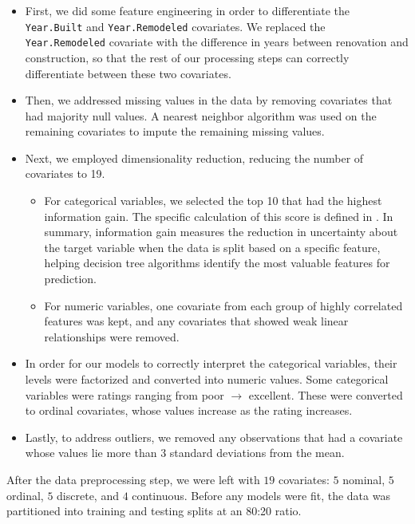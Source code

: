 \documentclass[aoas]{imsart}
\providecommand{\tightlist}{%
  \setlength{\itemsep}{0pt}\setlength{\parskip}{0pt}}
\numberwithin{equation}{section}
\theoremstyle{plain}
\theoremstyle{remark}
\begin{document}
\begin{itemize}
\item
  First, we did some feature engineering in order to differentiate the
  \texttt{Year.Built} and \texttt{Year.Remodeled} covariates. We
  replaced the \texttt{Year.Remodeled} covariate with the difference in
  years between renovation and construction, so that the rest of our
  processing steps can correctly differentiate between these two
  covariates.
\item
  Then, we addressed missing values in the data by removing covariates
  that had majority null values. A nearest neighbor algorithm was used
  on the remaining covariates to impute the remaining missing values.
\item
  Next, we employed dimensionality reduction, reducing the number of
  covariates to 19.

  \begin{itemize}
  \tightlist
  \item
    For categorical variables, we selected the top 10 that had the
    highest information gain. The specific calculation of this score is
    defined in \citet{quinlaninduction}. In summary, information gain
    measures the reduction in uncertainty about the target variable when
    the data is split based on a specific feature, helping decision tree
    algorithms identify the most valuable features for prediction.
  \item
    For numeric variables, one covariate from each group of highly
    correlated features was kept, and any covariates that showed weak
    linear relationships were removed.
  \end{itemize}
\item
  In order for our models to correctly interpret the categorical
  variables, their levels were factorized and converted into numeric
  values. Some categorical variables were ratings ranging from poor
  \(\to\) excellent. These were converted to ordinal covariates, whose
  values increase as the rating increases.
\item
  Lastly, to address outliers, we removed any observations that had a
  covariate whose values lie more than 3 standard deviations from the
  mean.
\end{itemize}

After the data preprocessing step, we were left with \(19\) covariates:
\(5\) nominal, \(5\) ordinal, \(5\) discrete, and \(4\) continuous.
Before any models were fit, the data was partitioned into training and
testing splits at an 80:20 ratio.
\end{document}
